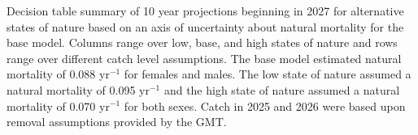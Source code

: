 \documentclass[
  english,
]{article}
\begin{document}
\begin{landscape}
\begin{longtable}
\end{longtable}

\endgroup

\end{landscape}

\begin{table}[H]

\caption{\label{tbl-decision-table}Decision table summary of 10 year
projections beginning in 2027 for alternative states of nature based on
an axis of uncertainty about natural mortality for the base model.
Columns range over low, base, and high states of nature and rows range
over different catch level assumptions. The base model estimated natural
mortality of 0.088 yr\(^{-1}\) for females and males. The low state of
nature assumed a natural mortality of 0.095 yr\(^{-1}\) and the high
state of nature assumed a natural mortality of 0.070 yr\(^{-1}\) for
both sexes. Catch in 2025 and 2026 were based upon removal assumptions
provided by the GMT.}

\centering{

}
\end{table}
\end{document}
